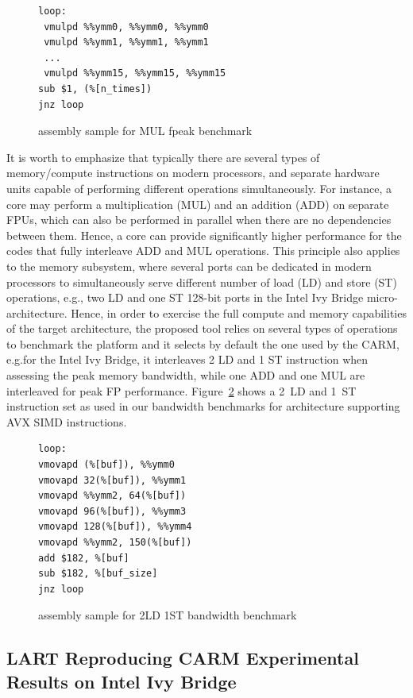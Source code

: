 \documentclass[twoside,twocolumn,9pt]{extarticle}
\begin{document}
\begin{figure}
  \centering
\begin{verbatim}
loop:
 vmulpd %%ymm0, %%ymm0, %%ymm0
 vmulpd %%ymm1, %%ymm1, %%ymm1
 ...
 vmulpd %%ymm15, %%ymm15, %%ymm15
sub $1, (%[n_times])
jnz loop
\end{verbatim}
\caption{assembly sample for MUL fpeak benchmark}
\label{src:fpeak}
\end{figure}

It is worth to emphasize that typically there are several types of memory/compute instructions on modern processors, and separate
hardware units capable of performing different operations simultaneously. For instance, a core
may perform a multiplication (MUL) and an addition (ADD) on separate FPUs, which  can also be performed in parallel when there are
no  dependencies between them. Hence, a core can provide significantly higher  performance for the codes that fully interleave ADD
and MUL operations. This principle also applies to the memory subsystem, where several ports can be dedicated in modern processors
to simultaneously serve different number of load (LD) and store (ST) operations, e.g., two LD and one ST 128-bit ports in the Intel
Ivy Bridge micro-architecture. Hence, in order to exercise the full  compute and memory capabilities of the target architecture,
the proposed tool relies on several types of operations to benchmark the platform and it selects by default the one used by
the CARM, e.g.for the Intel Ivy Bridge, it interleaves 2 LD and 1 ST instruction  when assessing the peak memory bandwidth, while
one ADD and one MUL are interleaved for peak FP performance.
Figure~\ref{src:bandwidth} shows a 2~LD and 1~ST instruction set as used in our bandwidth benchmarks for architecture supporting
AVX SIMD instructions.

\begin{figure}
  \centering
\begin{verbatim}
loop:
vmovapd (%[buf]), %%ymm0
vmovapd 32(%[buf]), %%ymm1
vmovapd %%ymm2, 64(%[buf])
vmovapd 96(%[buf]), %%ymm3
vmovapd 128(%[buf]), %%ymm4
vmovapd %%ymm2, 150(%[buf])
add $182, %[buf]
sub $182, %[buf_size]
jnz loop
\end{verbatim}
\caption{assembly sample for 2LD 1ST bandwidth benchmark}
\label{src:bandwidth}
\end{figure}

\subsection{LART Reproducing CARM Experimental Results on Intel Ivy Bridge}
\label{sub:CARM_reproduction}
\end{document}
